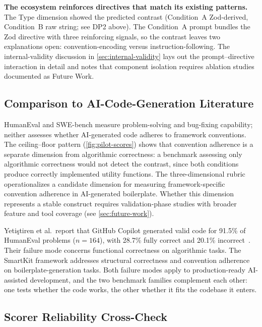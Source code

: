 \documentclass[12pt,a4paper]{report}
\begin{document}
\textbf{The ecosystem reinforces directives that match its existing patterns.} The Type dimension showed the predicted contrast (Condition~A Zod-derived, Condition~B raw string; see DP2 above). The Condition~A prompt bundles the Zod directive with three reinforcing signals, so the contrast leaves two explanations open: convention-encoding versus instruction-following. The internal-validity discussion in \autoref{sec:internal-validity} lays out the prompt--directive interaction in detail and notes that component isolation requires ablation studies documented as Future Work.

\subsection{Comparison to AI-Code-Generation Literature}
\label{sec:literature-comparison}

HumanEval and SWE-bench measure problem-solving and bug-fixing capability; neither assesses whether AI-generated code adheres to framework conventions. The ceiling--floor pattern (\autoref{fig:pilot-scores}) shows that convention adherence is a separate dimension from algorithmic correctness: a benchmark assessing only algorithmic correctness would not detect the contrast, since both conditions produce correctly implemented utility functions. The three-dimensional rubric operationalizes a candidate dimension for measuring framework-specific convention adherence in AI-generated boilerplate. Whether this dimension represents a stable construct requires validation-phase studies with broader feature and tool coverage (see \autoref{sec:future-work}).

Yeti\c{s}tiren et al.\ report that GitHub Copilot generated valid code for 91.5\% of HumanEval problems ($n=164$), with 28.7\% fully correct and 20.1\% incorrect~\parencite{yetistiren2022assessing}. Their failure mode concerns functional correctness on algorithmic tasks. The SmartKit framework addresses structural correctness and convention adherence on boilerplate-generation tasks. Both failure modes apply to production-ready AI-assisted development, and the two benchmark families complement each other: one tests whether the code works, the other whether it fits the codebase it enters.

\subsection{Scorer Reliability Cross-Check}
\label{sec:scorer-reliability}
\end{document}
